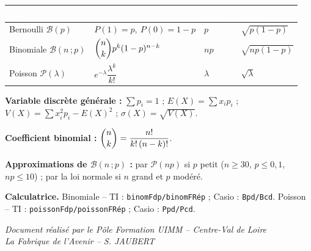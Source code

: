 \documentclass[a4paper,11pt]{article}
\begin{document}
\begin{tcolorbox}[colback=uimmlightblue, colframe=uimmblue, title={\textbf{Formulaire des lois discrètes}}, fonttitle=\large\bfseries\sffamily, coltitle=white, boxrule=1.5pt, arc=5pt]

\renewcommand{\arraystretch}{1.9}
\begin{tabular}{|>{\centering\arraybackslash}m{2.6cm}|>{\centering\arraybackslash}m{4.6cm}|>{\centering\arraybackslash}m{2.3cm}|>{\centering\arraybackslash}m{2.8cm}|}
\hline
\rowcolor{uimmblue}
\textcolor{white}{\textbf{Loi}} & \textcolor{white}{\textbf{$P(X=k)$}} & \textcolor{white}{\textbf{$E(X)$}} & \textcolor{white}{\textbf{$\sigma(X)$}} \\
\hline
Bernoulli $\mathcal{B}(p)$ & $P(1)=p,\ P(0)=1-p$ & $p$ & $\sqrt{p(1-p)}$ \\
\hline
Binomiale $\mathcal{B}(n\,;p)$ & $\dbinom{n}{k}p^{k}(1-p)^{n-k}$ & $np$ & $\sqrt{np(1-p)}$ \\
\hline
Poisson $\mathcal{P}(\lambda)$ & $e^{-\lambda}\dfrac{\lambda^{k}}{k!}$ & $\lambda$ & $\sqrt{\lambda}$ \\
\hline
\end{tabular}

\vspace{8pt}
\textbf{Variable discrète générale :} $\displaystyle \sum p_i = 1$ ; \; $E(X) = \sum x_i p_i$ ; \; $V(X) = \sum x_i^2 p_i - E(X)^2$ ; \; $\sigma(X) = \sqrt{V(X)}$.

\vspace{4pt}
\textbf{Coefficient binomial :} $\dbinom{n}{k} = \dfrac{n!}{k!\,(n-k)!}$.

\vspace{4pt}
\textbf{Approximations de $\mathcal{B}(n\,;p)$ :} par $\mathcal{P}(np)$ si $p$ petit ($n\geq30$, $p\leq0{,}1$, $np\leq10$) ; par la loi normale si $n$ grand et $p$ modéré.

\vspace{6pt}
\textbf{Calculatrice.} \; Binomiale -- TI : \texttt{binomFdp/binomFRép} ; Casio : \texttt{Bpd/Bcd}. \; Poisson -- TI : \texttt{poissonFdp/poissonFRép} ; Casio : \texttt{Ppd/Pcd}.
\end{tcolorbox}

\vfill
\begin{center}
\color{uimmgray}\small
\textit{Document réalisé par le Pôle Formation UIMM -- Centre-Val de Loire}\\
\textit{La Fabrique de l'Avenir -- S. JAUBERT}
\end{center}
\end{document}
